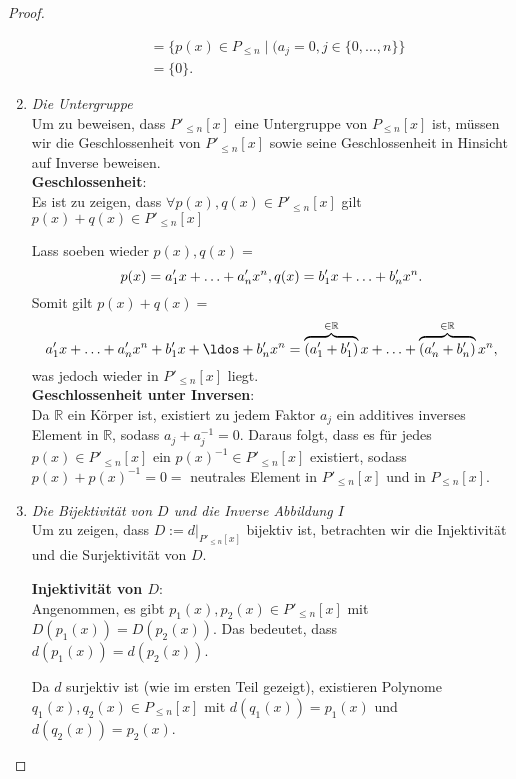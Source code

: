 \documentclass{../problemset}
\begin{document}
\begin{problem}
\begin{proof}
\begin{enumerate}
\begin{align}
			                                 & = \{p(x) \in P_{\le n} \mid (a_j = 0, j \in \{0, \ldots, n\}\}                                                                    \\
			                                 & = \{0\}.
		      \end{align}
		      \checkmark
		\item \textit{Die Untergruppe} \\
		      Um zu beweisen, dass $P'_{\le n}[x]$ eine Untergruppe von $P_{\le n}[x]$ ist, müssen wir die Geschlossenheit von $P'_{\le n}[x]$ sowie seine Geschlossenheit in Hinsicht auf Inverse beweisen. \\
		      \textbf{Geschlossenheit}: \\
		      Es ist zu zeigen, dass $\forall p(x),q(x) \in P'_{\le n}[x]$ gilt $p(x) + q(x) \in P'_{\le n}[x]$

		      Lass soeben wieder $p(x), q(x) =$ \[
			      p(x) = a^\prime_1x + \ldots + a^\prime_nx^n, \\
			      q(x) = b^\prime_1x + \ldots + b^\prime_nx^n.
		      \]
		      Somit gilt $p(x) + q(x) =$ \[
			      a^\prime_1x + \ldots + a^\prime_nx^n + b^\prime_1x + \ldos + b^\prime_nx^n =
			      \overbrace{(a^\prime_1+b^\prime_1)}^{\in \mathbb{R}}x + \ldots + \overbrace{(a^\prime_n+b^\prime_n)}^{\in \mathbb{R}}x^n,
		      \] was jedoch wieder in $P'_{\le n}[x]$ liegt.
		      \checkmark
		      \\
		      \textbf{Geschlossenheit unter Inversen}: \\
		      Da $\mathbb{R}$ ein Körper ist, existiert zu jedem Faktor $a_j$ ein additives inverses Element in $\mathbb{R}$, sodass $a_j + a_j^{-1} = 0$.
		      Daraus folgt, dass es für jedes $p(x) \in P'_{\le n}[x]$ ein $p(x)^{-1} \in P'_{\le n}[x]$ existiert, sodass $p(x) + p(x)^{-1} = 0 =$ neutrales Element in $P'_{\le n}[x]$ und in $P_{\le n}[x]$.
		      \checkmark
		\item \textit{Die Bijektivität von $D$ und die Inverse Abbildung $I$} \\
		      Um zu zeigen, dass $D := d|_{P'_{\le n}[x]}$ bijektiv ist, betrachten wir die Injektivität und die Surjektivität von $D$.

		      \textbf{Injektivität von $D$}: \\
		      Angenommen, es gibt $p_1(x), p_2(x) \in P'_{\le n}[x]$ mit $D(p_1(x)) = D(p_2(x))$. Das bedeutet, dass $d(p_1(x)) = d(p_2(x))$.

		      Da $d$ surjektiv ist (wie im ersten Teil gezeigt), existieren Polynome $q_1(x), q_2(x) \in P_{\le n}[x]$ mit $d(q_1(x)) = p_1(x)$ und $d(q_2(x)) = p_2(x)$.


\end{enumerate}
\end{proof}
\end{problem}
\end{document}
